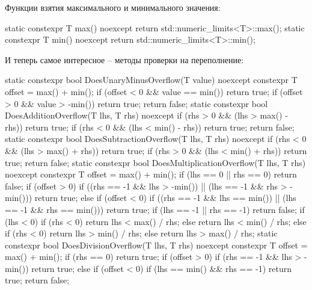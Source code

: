 Функции взятия максимального и минимального значения:
\begin{cppcode}
static constexpr T max() noexcept {
  return std::numeric_limits<T>::max();
}
static constexpr T min() noexcept {
  return std::numeric_limits<T>::min();
}
\end{cppcode}
И теперь самое интересное -- методы проверки на переполнение:
\begin{cppcode}
static constexpr bool DoesUnaryMinusOverflow(T value) noexcept {
  constexpr T offset = max() + min();
  if (offset < 0 && value == min())
    return true;
  if (offset > 0 && value > -min())
    return true;
  return false;
}
static constexpr bool DoesAdditionOverflow(T lhs, T rhs) noexcept {
  if (rhs > 0 && (lhs > max() - rhs))
    return true;
  if (rhs < 0 && (lhs < min() - rhs))
    return true;
  return false;
}
static constexpr bool DoesSubtractionOverflow(T lhs, T rhs) noexcept {
  if (rhs < 0 && (lhs > max() + rhs))
    return true;
  if (rhs > 0 && (lhs < min() + rhs))
    return true;
  return false;
}
static constexpr bool DoesMultiplicationOverflow(T lhs, T rhs) noexcept {
  constexpr T offset = max() + min();
  if (lhs == 0 || rhs == 0)
    return false;
  if (offset > 0) {
    if ((rhs == -1 && lhs > -min()) || (lhs == -1 && rhs > -min()))
      return true;
  } else if (offset < 0) {
    if ((rhs == -1 && lhs == min()) || (lhs == -1 && rhs == min()))
      return true;
  }
  if (lhs == -1 || rhs == -1)
    return false;
  if (lhs < 0) {
    if (rhs < 0) {
      return lhs < max() / rhs;
    } else {
      return lhs < min() / rhs;
    }
  } else {
    if (rhs < 0) {
      return lhs > min() / rhs;
    } else {
      return lhs > max() / rhs;
    }
  }
}
static constexpr bool DoesDivisionOverflow(T lhs, T rhs) noexcept {
  constexpr T offset = max() + min();
  if (rhs == 0)
    return true;
  if (offset > 0) {
    if (rhs == -1 && lhs > -min())
      return true;
  } else if (offset < 0) {
    if (lhs == min() && rhs == -1)
      return true;
  }
  return false;
}
\end{cppcode}
